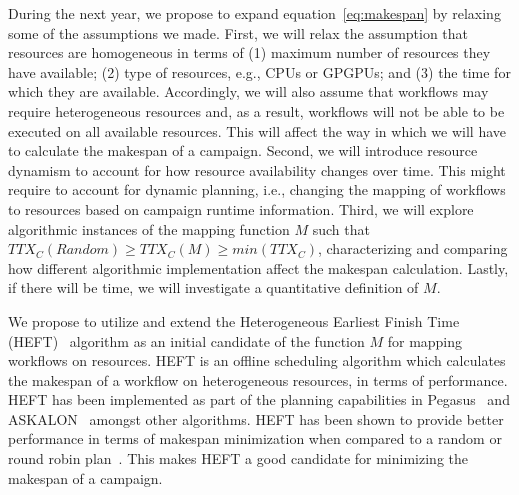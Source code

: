 During the next year, we propose to expand equation~\ref{eq:makespan} by relaxing some of the assumptions we made.
First, we will relax the assumption that resources are homogeneous in terms of (1) maximum number of resources they have available; (2) type of resources, e.g., CPUs or GPGPUs; and (3) the time for which they are available.
Accordingly, we will also assume that workflows may require heterogeneous resources and, as a result, workflows will not be able to be executed on all available resources. 
This will affect the way in which we will have to calculate the makespan of a campaign.
Second, we will introduce resource dynamism to account for how resource availability changes over time. 
This might require to account for dynamic planning, i.e., changing the mapping of workflows to resources based on campaign runtime information.
Third, we will explore algorithmic instances of the mapping function $ M $ such that $TTX_{C}(Random) \geq TTX_{C}(M) \geq min(TTX_{C})$, characterizing and comparing how different algorithmic implementation affect the makespan calculation.
Lastly, if there will be time, we will investigate a quantitative definition of $ M $.


We propose to utilize and extend the Heterogeneous Earliest Finish Time (HEFT)~\cite{topcuoglu2002performance} algorithm  as an initial candidate of the function $ M $ for mapping workflows on resources.
HEFT is an offline scheduling algorithm which calculates the makespan of a workflow on heterogeneous resources, in terms of performance.
HEFT has been implemented as part of the planning capabilities in Pegasus~\cite{deelman2015pegasus} and ASKALON~\cite{fahringer2005askalon} amongst other algorithms.
HEFT has been shown to provide better performance in terms of makespan minimization when compared to a random or round robin plan~\cite{topcuoglu2002performance,deelman2015pegasus}.
This makes HEFT a good candidate for minimizing the makespan of a campaign.


